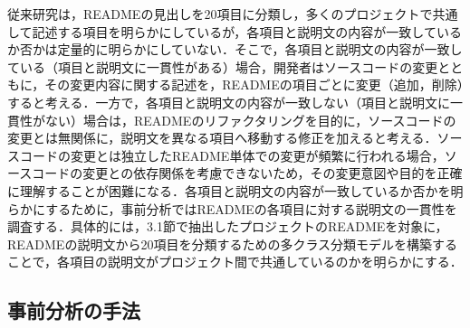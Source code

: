 \documentclass[submit]{ipsj}
\begin{document}
従来研究\cite{Ikeda_README}は，READMEの見出しを20項目に分類し，多くのプロジェクトで共通して記述する項目を明らかにしているが，各項目と説明文の内容が一致しているか否かは定量的に明らかにしていない．そこで，各項目と説明文の内容が一致している（項目と説明文に一貫性がある）場合，開発者はソースコードの変更とともに，その変更内容に関する記述を，READMEの項目ごとに変更（追加，削除）すると考える．一方で，各項目と説明文の内容が一致しない（項目と説明文に一貫性がない）場合は，READMEのリファクタリングを目的に，ソースコードの変更とは無関係に，説明文を異なる項目へ移動する修正を加えると考える．ソースコードの変更とは独立したREADME単体での変更が頻繁に行われる場合，ソースコードの変更との依存関係を考慮できないため，その変更意図や目的を正確に理解することが困難になる．各項目と説明文の内容が一致しているか否かを明らかにするために，事前分析ではREADMEの各項目に対する説明文の一貫性を調査する．具体的には，3.1節で抽出したプロジェクトのREADMEを対象に，READMEの説明文から20項目を分類するための多クラス分類モデルを構築することで，各項目の説明文がプロジェクト間で共通しているのかを明らかにする．







\subsection{事前分析の手法}
\end{document}
